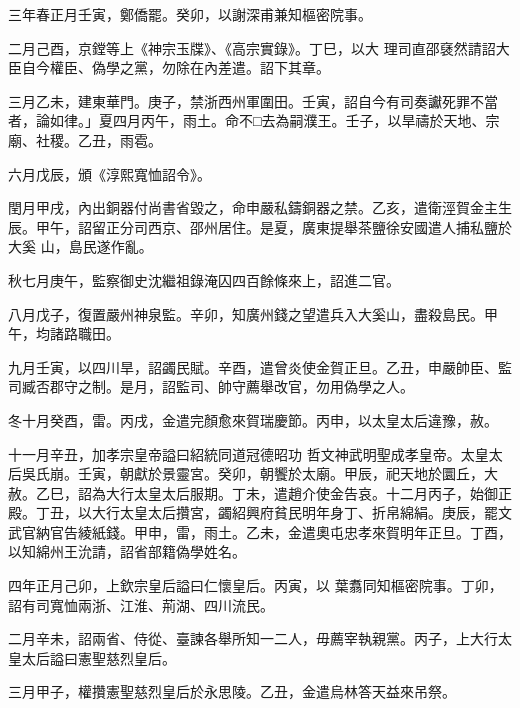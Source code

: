 \begin{pinyinscope}
 三年春正月壬寅，鄭僑罷。癸卯，以謝深甫兼知樞密院事。



 二月己酉，京鏜等上《神宗玉牒》、《高宗實錄》。丁巳，以大
 理司直邵褎然請詔大臣自今權臣、偽學之黨，勿除在內差遣。詔下其章。



 三月乙未，建東華門。庚子，禁浙西州軍圍田。壬寅，詔自今有司奏讞死罪不當者，論如律。」夏四月丙午，雨土。命不□去為嗣濮王。壬子，以旱禱於天地、宗廟、社稷。乙丑，雨雹。



 六月戊辰，頒《淳熙寬恤詔令》。



 閏月甲戌，內出銅器付尚書省毀之，命申嚴私鑄銅器之禁。乙亥，遣衛涇賀金主生辰。甲午，詔留正分司西京、邵州居住。是夏，廣東提舉茶鹽徐安國遣人捕私鹽於大奚
 山，島民遂作亂。



 秋七月庚午，監察御史沈繼祖錄淹囚四百餘條來上，詔進二官。



 八月戊子，復置嚴州神泉監。辛卯，知廣州錢之望遣兵入大奚山，盡殺島民。甲午，均諸路職田。



 九月壬寅，以四川旱，詔蠲民賦。辛酉，遣曾炎使金賀正旦。乙丑，申嚴帥臣、監司臧否郡守之制。是月，詔監司、帥守薦舉改官，勿用偽學之人。



 冬十月癸酉，雷。丙戌，金遣完顏愈來賀瑞慶節。丙申，以太皇太后違豫，赦。



 十一月辛丑，加孝宗皇帝謚曰紹統同道冠德昭功
 哲文神武明聖成孝皇帝。太皇太后吳氏崩。壬寅，朝獻於景靈宮。癸卯，朝饗於太廟。甲辰，祀天地於圜丘，大赦。乙巳，詔為大行太皇太后服期。丁未，遣趙介使金告哀。十二月丙子，始御正殿。丁丑，以大行太皇太后攢宮，蠲紹興府貧民明年身丁、折帛綿絹。庚辰，罷文武官納官告綾紙錢。甲申，雷，雨土。乙未，金遣奧屯忠孝來賀明年正旦。丁酉，以知綿州王沇請，詔省部籍偽學姓名。



 四年正月己卯，上欽宗皇后謚曰仁懷皇后。丙寅，以
 葉翥同知樞密院事。丁卯，詔有司寬恤兩浙、江淮、荊湖、四川流民。



 二月辛未，詔兩省、侍從、臺諫各舉所知一二人，毋薦宰執親黨。丙子，上大行太皇太后謚曰憲聖慈烈皇后。



 三月甲子，權攢憲聖慈烈皇后於永思陵。乙丑，金遣烏林答天益來吊祭。




\end{pinyinscope}
